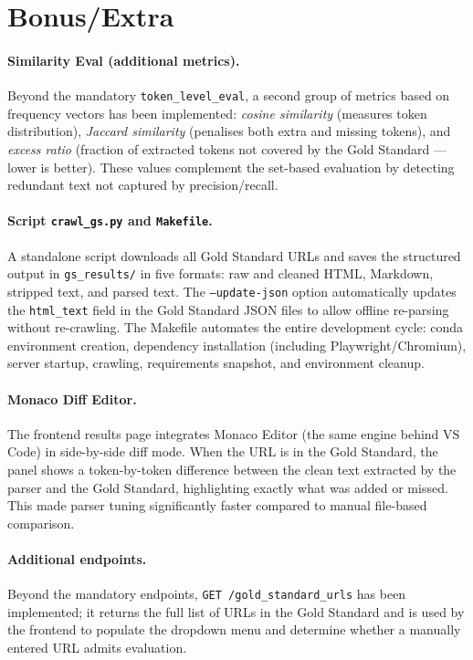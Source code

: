 \documentclass[11pt]{article}
\begin{document}
\section*{Bonus/Extra}

\paragraph{Similarity Eval (additional metrics).} Beyond the mandatory \texttt{token\_level\_eval}, a second group of metrics based on frequency vectors has been implemented: \emph{cosine similarity} (measures token distribution), \emph{Jaccard similarity} (penalises both extra and missing tokens), and \emph{excess ratio} (fraction of extracted tokens not covered by the Gold Standard — lower is better). These values complement the set-based evaluation by detecting redundant text not captured by precision/recall.

\paragraph{Script \texttt{crawl\_gs.py} and \texttt{Makefile}.} A standalone script downloads all Gold Standard URLs and saves the structured output in \texttt{gs\_results/} in five formats: raw and cleaned HTML, Markdown, stripped text, and parsed text. The \texttt{--update-json} option automatically updates the \texttt{html\_text} field in the Gold Standard JSON files to allow offline re-parsing without re-crawling. The Makefile automates the entire development cycle: conda environment creation, dependency installation (including Playwright/Chromium), server startup, crawling, requirements snapshot, and environment cleanup.

\paragraph{Monaco Diff Editor.} The frontend results page integrates Monaco Editor (the same engine behind VS Code) in side-by-side diff mode. When the URL is in the Gold Standard, the panel shows a token-by-token difference between the clean text extracted by the parser and the Gold Standard, highlighting exactly what was added or missed. This made parser tuning significantly faster compared to manual file-based comparison.

\paragraph{Additional endpoints.} Beyond the mandatory endpoints, \texttt{GET /gold\_standard\_urls} has been implemented; it returns the full list of URLs in the Gold Standard and is used by the frontend to populate the dropdown menu and determine whether a manually entered URL admits evaluation.
\end{document}
